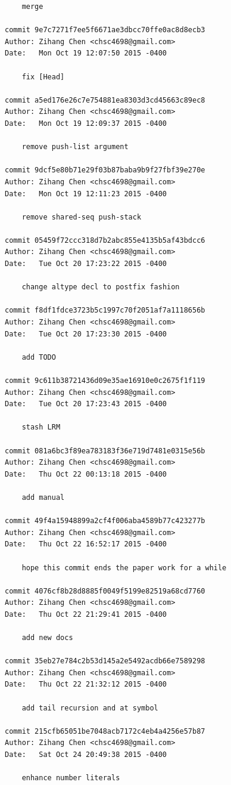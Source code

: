 \documentclass{report}
\begin{document}
\begin{appendices}
\begin{verbatim}
    merge

commit 9e7c7271f7ee5f6671ae3dbcc70ffe0ac8d8ecb3
Author: Zihang Chen <chsc4698@gmail.com>
Date:   Mon Oct 19 12:07:50 2015 -0400

    fix [Head]

commit a5ed176e26c7e754881ea8303d3cd45663c89ec8
Author: Zihang Chen <chsc4698@gmail.com>
Date:   Mon Oct 19 12:09:37 2015 -0400

    remove push-list argument

commit 9dcf5e80b71e29f03b87baba9b9f27fbf39e270e
Author: Zihang Chen <chsc4698@gmail.com>
Date:   Mon Oct 19 12:11:23 2015 -0400

    remove shared-seq push-stack

commit 05459f72ccc318d7b2abc855e4135b5af43bdcc6
Author: Zihang Chen <chsc4698@gmail.com>
Date:   Tue Oct 20 17:23:22 2015 -0400

    change altype decl to postfix fashion

commit f8df1fdce3723b5c1997c70f2051af7a1118656b
Author: Zihang Chen <chsc4698@gmail.com>
Date:   Tue Oct 20 17:23:30 2015 -0400

    add TODO

commit 9c611b38721436d09e35ae16910e0c2675f1f119
Author: Zihang Chen <chsc4698@gmail.com>
Date:   Tue Oct 20 17:23:43 2015 -0400

    stash LRM

commit 081a6bc3f89ea783183f36e719d7481e0315e56b
Author: Zihang Chen <chsc4698@gmail.com>
Date:   Thu Oct 22 00:13:18 2015 -0400

    add manual

commit 49f4a15948899a2cf4f006aba4589b77c423277b
Author: Zihang Chen <chsc4698@gmail.com>
Date:   Thu Oct 22 16:52:17 2015 -0400

    hope this commit ends the paper work for a while

commit 4076cf8b28d8885f0049f5199e82519a68cd7760
Author: Zihang Chen <chsc4698@gmail.com>
Date:   Thu Oct 22 21:29:41 2015 -0400

    add new docs

commit 35eb27e784c2b53d145a2e5492acdb66e7589298
Author: Zihang Chen <chsc4698@gmail.com>
Date:   Thu Oct 22 21:32:12 2015 -0400

    add tail recursion and at symbol

commit 215cfb65051be7048acb7172c4eb4a4256e57b87
Author: Zihang Chen <chsc4698@gmail.com>
Date:   Sat Oct 24 20:49:38 2015 -0400

    enhance number literals


\end{verbatim}
\end{appendices}
\end{document}
